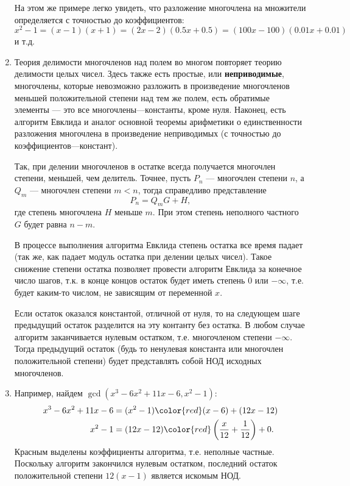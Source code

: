 \begin{enumerate}
На этом же примере легко увидеть, что разложение многочлена на множители определяется с точностью до коэффициентов:
$$
x^2-1=(x-1)(x+1)=(2x-2)(0.5x+0.5)=(100x-100)(0.01x+0.01)
$$
и т.д.

\item Теория делимости многочленов над полем во многом повторяет теорию делимости целых чисел. Здесь также есть простые, или \textbf{неприводимые}, многочлены, которые невозможно разложить в произведение многочленов меньшей положительной степени над тем же полем, есть обратимые элементы --- это все многочлены---константы, кроме нуля. Наконец, есть алгоритм Евклида и аналог основной теоремы арифметики о единственности разложения многочлена в произведение неприводимых (с точностью до коэффициентов---констант).

Так, при делении многочленов в остатке всегда получается многочлен степени, меньшей, чем делитель. Точнее, пусть $P_n$ --- многочлен степени $n$, а $Q_m$ --- многочлен степени $m<n$, тогда справедливо представление
$$
P_n = Q_m G+H,
$$
где степень многочлена $H$ меньше $m$. При этом степень неполного частного $G$ будет равна $n-m$.

В процессе выполнения алгоритма Евклида степень остатка все время падает (так же, как падает модуль остатка при делении целых чисел).
Такое снижение степени остатка позволяет провести алгоритм Евклида за конечное число шагов, т.к. в конце концов остаток будет иметь степень 0 или $-\infty$, т.е. будет каким-то числом, не зависящим от переменной $x$.

Если остаток оказался константой, отличной от нуля, то на следующем шаге предыдущий остаток разделится на эту контанту без остатка. В любом случае алгоритм заканчивается нулевым остатком, т.е. многочленом степени $-\infty$. Тогда предыдущий остаток (будь то ненулевая константа или многочлен положительной степени) будет представлять собой НОД исходных многочленов.

\item
Например, найдем $\gcd(x^3-6x^2+11x-6,x^2-1)$:
\begin{align*}
x^3-6x^2+11x-6 & = (x^2-1){\color{red}(x-6)} + (12x-12) \\
x^2-1 & = (12x-12){\color{red}\left(\frac{x}{12}+\frac{1}{12}\right)} + 0.
\end{align*}
Красным выделены коэффициенты алгоритма, т.е. неполные частные. Поскольку алгоритм закончился нулевым остатком, последний остаток положительной степени $12(x-1)$ является искомым НОД.


\end{enumerate}
